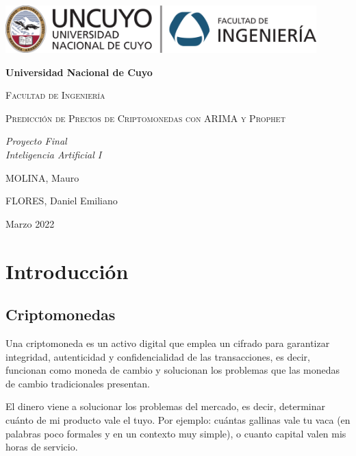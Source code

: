 \documentclass[a4paper,10pt]{article}
\begin{document}
\begin{titlepage}
\centering
{\includegraphics[width=0.9\textwidth]{fing_uncuyo}\par}
\vspace{1cm}
{\bfseries\LARGE Universidad Nacional de Cuyo \par}
\vspace{1cm}
{\scshape\Large Facultad de Ingeniería \par}
\vspace{3cm}
{\scshape\Huge Predicción de Precios de Criptomonedas con ARIMA y Prophet \par}
\vspace{3cm}
{\itshape\Large Proyecto Final\\Inteligencia Artificial I \par}
\vfill
{\Large MOLINA, Mauro \par}
{\Large FLORES, Daniel Emiliano \par}
\vfill
{\Large Marzo 2022 \par}
\end{titlepage}

\newpage

\begin{abstract}

\end{abstract}

\newpage

\tableofcontents

\newpage

\section{Introducción}

\subsection{Criptomonedas}

 Una criptomoneda es un activo digital que emplea un cifrado para garantizar integridad, autenticidad y confidencialidad de las transacciones, es decir, funcionan como moneda de cambio y solucionan los problemas que las monedas de cambio tradicionales presentan.

 El dinero viene a solucionar los problemas del mercado, es decir, determinar cuánto de mi producto vale el tuyo. Por ejemplo: cuántas gallinas vale tu vaca (en palabras poco formales y en un contexto muy simple), o cuanto capital valen mis horas de servicio.
\end{document}
